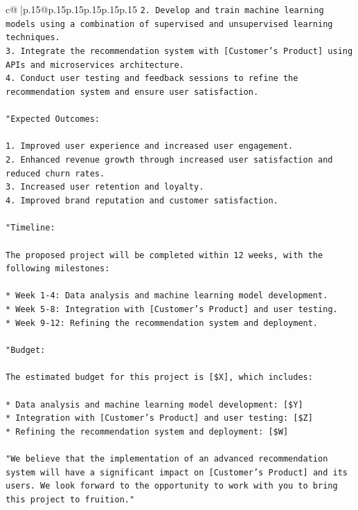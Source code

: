 \documentclass{article}
\begin{document}
{\begin{supertabular}{c@{$\;$}|p{.15\linewidth}@{}p{.15\linewidth}p{.15\linewidth}p{.15\linewidth}p{.15\linewidth}p{.15\linewidth}}
{{{\texttt{2. Develop and train machine learning models using a combination of supervised and unsupervised learning techniques.} \\
\texttt{3. Integrate the recommendation system with {[}Customer's Product{]} using APIs and microservices architecture.} \\
\texttt{4. Conduct user testing and feedback sessions to refine the recommendation system and ensure user satisfaction.} \\
\\ 
\texttt{"Expected Outcomes:} \\
\\ 
\texttt{1. Improved user experience and increased user engagement.} \\
\texttt{2. Enhanced revenue growth through increased user satisfaction and reduced churn rates.} \\
\texttt{3. Increased user retention and loyalty.} \\
\texttt{4. Improved brand reputation and customer satisfaction.} \\
\\ 
\texttt{"Timeline:} \\
\\ 
\texttt{The proposed project will be completed within 12 weeks, with the following milestones:} \\
\\ 
\texttt{* Week 1{-}4: Data analysis and machine learning model development.} \\
\texttt{* Week 5{-}8: Integration with {[}Customer's Product{]} and user testing.} \\
\texttt{* Week 9{-}12: Refining the recommendation system and deployment.} \\
\\ 
\texttt{"Budget:} \\
\\ 
\texttt{The estimated budget for this project is {[}\$X{]}, which includes:} \\
\\ 
\texttt{* Data analysis and machine learning model development: {[}\$Y{]}} \\
\texttt{* Integration with {[}Customer's Product{]} and user testing: {[}\$Z{]}} \\
\texttt{* Refining the recommendation system and deployment: {[}\$W{]}} \\
\\ 
\texttt{"We believe that the implementation of an advanced recommendation system will have a significant impact on {[}Customer's Product{]} and its users. We look forward to the opportunity to work with you to bring this project to fruition."} \\
}}}
\end{supertabular}}
\end{document}
